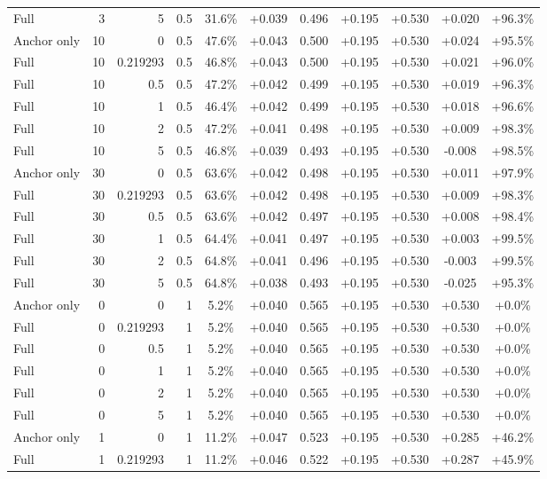 \begin{table}[htbp]
\begin{tabular}{lrrrccccccc}
Full & 3 & 5 & 0.5 & 31.6\% & +0.039 & 0.496 & +0.195 & +0.530 & +0.020 & +96.3\% \\
Anchor only & 10 & 0 & 0.5 & 47.6\% & +0.043 & 0.500 & +0.195 & +0.530 & +0.024 & +95.5\% \\
Full & 10 & 0.219293 & 0.5 & 46.8\% & +0.043 & 0.500 & +0.195 & +0.530 & +0.021 & +96.0\% \\
Full & 10 & 0.5 & 0.5 & 47.2\% & +0.042 & 0.499 & +0.195 & +0.530 & +0.019 & +96.3\% \\
Full & 10 & 1 & 0.5 & 46.4\% & +0.042 & 0.499 & +0.195 & +0.530 & +0.018 & +96.6\% \\
Full & 10 & 2 & 0.5 & 47.2\% & +0.041 & 0.498 & +0.195 & +0.530 & +0.009 & +98.3\% \\
Full & 10 & 5 & 0.5 & 46.8\% & +0.039 & 0.493 & +0.195 & +0.530 & -0.008 & +98.5\% \\
Anchor only & 30 & 0 & 0.5 & 63.6\% & +0.042 & 0.498 & +0.195 & +0.530 & +0.011 & +97.9\% \\
Full & 30 & 0.219293 & 0.5 & 63.6\% & +0.042 & 0.498 & +0.195 & +0.530 & +0.009 & +98.3\% \\
Full & 30 & 0.5 & 0.5 & 63.6\% & +0.042 & 0.497 & +0.195 & +0.530 & +0.008 & +98.4\% \\
Full & 30 & 1 & 0.5 & 64.4\% & +0.041 & 0.497 & +0.195 & +0.530 & +0.003 & +99.5\% \\
Full & 30 & 2 & 0.5 & 64.8\% & +0.041 & 0.496 & +0.195 & +0.530 & -0.003 & +99.5\% \\
Full & 30 & 5 & 0.5 & 64.8\% & +0.038 & 0.493 & +0.195 & +0.530 & -0.025 & +95.3\% \\
Anchor only & 0 & 0 & 1 & 5.2\% & +0.040 & 0.565 & +0.195 & +0.530 & +0.530 & +0.0\% \\
Full & 0 & 0.219293 & 1 & 5.2\% & +0.040 & 0.565 & +0.195 & +0.530 & +0.530 & +0.0\% \\
Full & 0 & 0.5 & 1 & 5.2\% & +0.040 & 0.565 & +0.195 & +0.530 & +0.530 & +0.0\% \\
Full & 0 & 1 & 1 & 5.2\% & +0.040 & 0.565 & +0.195 & +0.530 & +0.530 & +0.0\% \\
Full & 0 & 2 & 1 & 5.2\% & +0.040 & 0.565 & +0.195 & +0.530 & +0.530 & +0.0\% \\
Full & 0 & 5 & 1 & 5.2\% & +0.040 & 0.565 & +0.195 & +0.530 & +0.530 & +0.0\% \\
Anchor only & 1 & 0 & 1 & 11.2\% & +0.047 & 0.523 & +0.195 & +0.530 & +0.285 & +46.2\% \\
Full & 1 & 0.219293 & 1 & 11.2\% & +0.046 & 0.522 & +0.195 & +0.530 & +0.287 & +45.9\% \\

\end{tabular}
\end{table}
